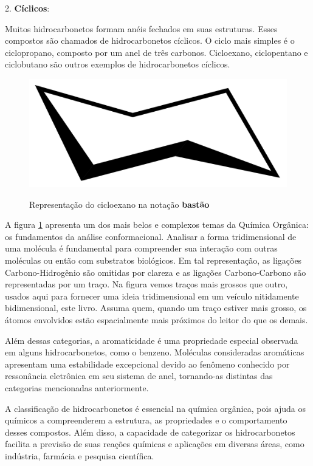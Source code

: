 2. \textbf{Cíclicos}:

Muitos hidrocarbonetos formam anéis fechados em suas estruturas. Esses compostos são chamados de hidrocarbonetos cíclicos. O ciclo mais simples é o ciclopropano, composto por um anel de três carbonos. Cicloexano, ciclopentano e ciclobutano são outros exemplos de hidrocarbonetos cíclicos.

\begin{figure}[h]\centering
\caption{Representação do cicloexano na notação \textbf{bastão}}
\includegraphics[scale=0.1]{imagens/2560px-Chair_conformation_of_cyclohexane.svg.png}
\label{fig:cicloexano}\vspace{0.5cm}\end{figure}

A figura \ref{fig:cicloexano} apresenta um dos mais belos e complexos temas da Química Orgânica: os fundamentos da análise conformacional. Analisar a forma tridimensional de uma molécula é fundamental para compreender sua interação com outras moléculas ou então com substratos biológicos. Em tal representação, as ligações Carbono-Hidrogênio são omitidas por clareza e as ligações Carbono-Carbono são representadas por um traço. Na figura vemos traços mais grossos que outro, usados aqui para fornecer uma ideia tridimensional em um veículo nitidamente bidimensional, este livro. Assuma quem, quando um traço estiver mais grosso, os átomos envolvidos estão espacialmente mais próximos do leitor do que os demais.

Além dessas categorias, a aromaticidade é uma propriedade especial observada em alguns hidrocarbonetos, como o benzeno. Moléculas consideradas aromáticas apresentam uma estabilidade excepcional devido ao fenômeno conhecido por ressonância eletrônica em seu sistema de anel, tornando-as distintas das categorias mencionadas anteriormente.

A classificação de hidrocarbonetos é essencial na química orgânica, pois ajuda os químicos a compreenderem a estrutura, as propriedades e o comportamento desses compostos. Além disso, a capacidade de categorizar os hidrocarbonetos facilita a previsão de suas reações químicas e aplicações em diversas áreas, como indústria, farmácia e pesquisa científica. 

